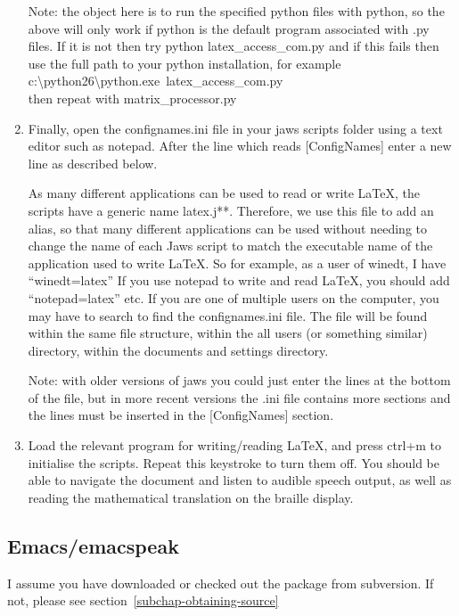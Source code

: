 \documentclass[12pt,a4paper]{report}
\begin{document}
\begin{enumerate}
Note: the object here is to run the specified python files with 
python, so the above will only work if python is the default program
associated with .py files.  If it is not then try 
python latex\_access\_com.py
and if this fails then use the full path to your python installation,
for example \\
\mbox{c:\textbackslash python26\textbackslash python.exe latex\_access\_com.py}\\
then repeat with matrix\_processor.py
\item Finally, open the confignames.ini file in your jaws scripts folder
using a text editor such as notepad. After the line which reads
[ConfigNames]
enter a new line as described below.

As many different applications can be used to read or write LaTeX, the scripts have a
generic name latex.j**. Therefore, we use this file to add an alias,
so that many different applications can be used without needing to
change the name of each Jaws script to match the executable name of
the application used to write LaTeX. So for example, as a user of
winedt, I have ``winedt=latex'' If you use notepad to write and read
LaTeX, you should add ``notepad=latex'' etc.  If you are one of multiple
users on the computer, you may have to search to find the
confignames.ini file. The file will be found within the same file
structure, within the all users (or something similar) directory,
within the documents and settings directory.

Note: with older versions of jaws you could just enter the lines at
the bottom of the file, but in more recent versions the .ini file
contains more sections and the lines must be inserted in the
[ConfigNames] section.
\item Load the relevant program for writing/reading LaTeX, and press
ctrl+m to initialise the scripts. Repeat this keystroke to turn them
off. You should be able to navigate the document and listen to audible
speech output, as well as reading the mathematical translation on the
braille display.
\end{enumerate}

\subsection{Emacs/emacspeak}
\label{subsubchap-emacs}

I assume you have downloaded or checked out the package from
subversion. If not, please see section~\ref{subchap-obtaining-source}
\end{document}

